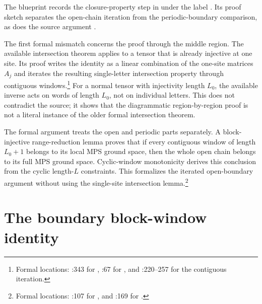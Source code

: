 \documentclass{article}
\begin{document}
The blueprint records the closure-property step in
under the label . Its proof sketch
separates the open-chain iteration from the periodic-boundary comparison, as
does the source argument \cite{Cirac2021Matrix}.

The first formal mismatch concerns the proof through the middle region. The
available intersection theorem applies to a tensor that is already injective
at one site. Its proof writes the identity as a linear combination of the
one-site matrices $A_j$ and iterates the resulting single-letter intersection
property through contiguous windows.\footnote{Formal locations:
:343 for
,
:67 for
, and
:220--257 for the
contiguous iteration.}
For a normal tensor with injectivity length $L_0$, the available inverse acts
on words of length $L_0$, not on individual letters. This does not contradict
the source; it shows that the diagrammatic region-by-region proof is not a
literal instance of the older formal intersection theorem.

The formal argument treats the open and periodic parts separately. A
block-injective range-reduction lemma proves that if every contiguous window
of length $L_0+1$ belongs to its local MPS ground space, then the whole open
chain belongs to its full MPS ground space. Cyclic-window monotonicity derives
this conclusion from the cyclic length-$L$ constraints. This formalizes the
iterated open-boundary argument without using the single-site intersection
lemma.\footnote{Formal locations:
:107 for
, and
:169 for
.}

\section{The boundary block-window identity}
\end{document}
